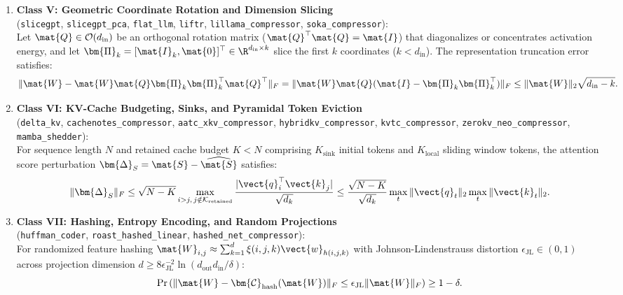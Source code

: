 \begin{theorem}
\begin{enumerate}
    \item \textbf{Class V: Geometric Coordinate Rotation and Dimension Slicing} \\
    (\texttt{slicegpt}, \texttt{slicegpt\_pca}, \texttt{flat\_llm}, \texttt{liftr}, \texttt{lillama\_compressor}, \texttt{soka\_compressor}): \\
    Let $\mat{Q} \in \mathcal{O}(d_{\text{in}})$ be an orthogonal rotation matrix ($\mat{Q}^\top \mat{Q} = \mat{I}$) that diagonalizes or concentrates activation energy, and let $\bm{\Pi}_k = [\mat{I}_k, \mat{0}]^\top \in \R^{d_{\text{in}} \times k}$ slice the first $k$ coordinates ($k < d_{\text{in}}$). The representation truncation error satisfies:
    \begin{equation}
    \|\mat{W} - \mat{W} \mat{Q} \bm{\Pi}_k \bm{\Pi}_k^\top \mat{Q}^\top\|_F = \|\mat{W} \mat{Q} (\mat{I} - \bm{\Pi}_k \bm{\Pi}_k^\top)\|_F \le \|\mat{W}\|_2 \sqrt{d_{\text{in}} - k}.
    \label{eq:bound_class5_slicegpt}
    \end{equation}

    \item \textbf{Class VI: KV-Cache Budgeting, Sinks, and Pyramidal Token Eviction} \\
    (\texttt{delta\_kv}, \texttt{cachenotes\_compressor}, \texttt{aatc\_xkv\_compressor}, \texttt{hybridkv\_compressor}, \texttt{kvtc\_compressor}, \texttt{zerokv\_neo\_compressor}, \texttt{mamba\_shedder}): \\
    For sequence length $N$ and retained cache budget $K < N$ comprising $K_{\text{sink}}$ initial tokens and $K_{\text{local}}$ sliding window tokens, the attention score perturbation $\bm{\Delta}_S = \mat{S} - \widehat{\mat{S}}$ satisfies:
    \begin{equation}
    \|\bm{\Delta}_S\|_F \le \sqrt{N - K} \max_{i > j, \, j \notin \mathcal{K}_{\text{retained}}} \frac{|\vect{q}_i^\top \vect{k}_j|}{\sqrt{d_k}} \le \frac{\sqrt{N - K}}{\sqrt{d_k}} \max_t \|\vect{q}_t\|_2 \max_t \|\vect{k}_t\|_2.
    \label{eq:bound_class6_kv_cache}
    \end{equation}

    \item \textbf{Class VII: Hashing, Entropy Encoding, and Random Projections} \\
    (\texttt{huffman\_coder}, \texttt{roast\_hashed\_linear}, \texttt{hashed\_net\_compressor}): \\
    For randomized feature hashing $\mat{W}_{i, j} \approx \sum_{k=1}^d \xi(i, j, k) \vect{w}_{h(i, j, k)}$ with Johnson-Lindenstrauss distortion $\epsilon_{\text{JL}} \in (0, 1)$ across projection dimension $d \ge 8 \epsilon_{\text{JL}}^{-2} \ln(d_{\text{out}} d_{\text{in}} / \delta)$:
    \begin{equation}
    \Pr\left( \|\mat{W} - \bm{\mathcal{C}}_{\text{hash}}(\mat{W})\|_F \le \epsilon_{\text{JL}} \|\mat{W}\|_F \right) \ge 1 - \delta.
    \label{eq:bound_class7_hashing}
    \end{equation}
\end{enumerate}
\end{theorem}

